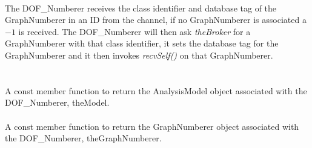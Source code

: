 \\
The DOF\_Numberer receives the class identifier and database tag of
the GraphNumberer in an ID from the channel, if no GraphNumberer is
associated a $-1$ is received. The DOF\_Numberer will then ask {\em
theBroker} for a GraphNumberer with that class identifier, it sets the
database tag for the GraphNumberer and it then invokes {\em
recvSelf()} on that GraphNumberer. \\  

  \\
 \\
A const member function to return the AnalysisModel object associated with
the DOF\_Numberer, \p theModel. \\

 \\
A const member function to return the GraphNumberer object associated with
the DOF\_Numberer, \p theGraphNumberer. \\







